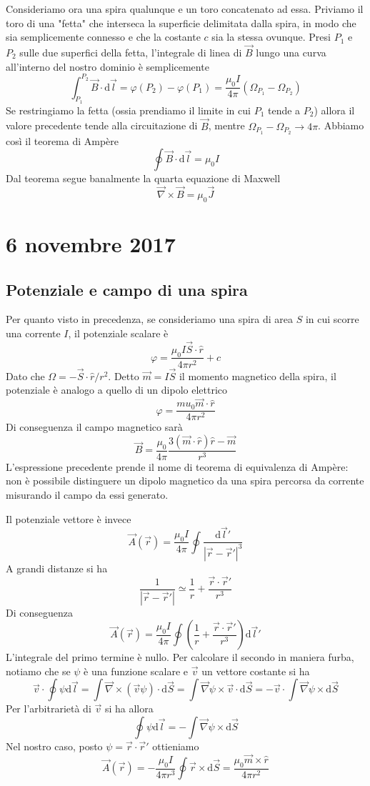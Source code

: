\documentclass[a4paper,11pt]{book}
\let\oldnabla\nabla
\renewcommand{\nabla}{\vec{\oldnabla}}
\newcommand{\dif}{\mathrm{d}}
\theoremstyle{definition}
\theoremstyle{theorem}
\begin{document}
Consideriamo ora una spira qualunque e un toro concatenato ad essa. Priviamo il toro di una "fetta" che interseca la superficie delimitata dalla spira, in modo che sia semplicemente connesso e che la costante $c$ sia la stessa ovunque. Presi $P_1$ e $P_2$ sulle due superfici della fetta, l'integrale di linea di $\vec{B}$ lungo una curva all'interno del nostro dominio è semplicemente
\[\int_{P_1}^{P_2}\vec{B}\cdot\dif\vec{l}=\varphi(P_2)-\varphi(P_1)=\frac{\mu_0I}{4\pi}(\Omega_{P_1}-\Omega_{P_2})\]
Se restringiamo la fetta (ossia prendiamo il limite in cui $P_1$ tende a $P_2$) allora il valore precedente tende alla circuitazione di $\vec{B}$, mentre $\Omega_{P_1}-\Omega_{P_2}\to4\pi$. Abbiamo così il teorema di Ampère
\[\oint\vec{B}\cdot\dif\vec{l}=\mu_0I\]
Dal teorema segue banalmente la quarta equazione di Maxwell
\[\nabla\times\vec{B}=\mu_0\vec{J}\]
\section{6 novembre 2017}
\subsection{Potenziale e campo di una spira}
Per quanto visto in precedenza, se consideriamo una spira di area $S$ in cui scorre una corrente $I$, il potenziale scalare è
\[\varphi=\frac{\mu_0I\vec{S}\cdot\hat{r}}{4\pi r^2}+c\]
Dato che $\Omega=-\vec{S}\cdot\hat{r}/r^2$. Detto $\vec{m}=I\vec{S}$ il momento magnetico della spira, il potenziale è analogo a quello di un dipolo elettrico
\[\varphi=\frac{mu_0\vec{m}\cdot\hat{r}}{4\pi r^2}\]
Di conseguenza il campo magnetico sarà
\[\vec{B}=\frac{\mu_0}{4\pi}\frac{3(\vec{m}\cdot\hat{r})\hat{r}-\vec{m}}{r^3}\]
L'espressione precedente prende il nome di teorema di equivalenza di Ampère: non è possibile distinguere un dipolo magnetico da una spira percorsa da corrente misurando il campo da essi generato.

Il potenziale vettore è invece
\[\vec{A}(\vec{r})=\frac{\mu_0I}{4\pi}\oint\frac{\dif\vec{l}'}{|\vec{r}-\vec{r}'|^3}\]
A grandi distanze si ha
\[\frac{1}{|\vec{r}-\vec{r}'|}\simeq\frac{1}{r}+\frac{\vec{r}\cdot\vec{r}'}{r^3}\]
Di conseguenza
\[\vec{A}(\vec{r})=\frac{\mu_0I}{4\pi}\oint\left(\frac{1}{r}+\frac{\vec{r}\cdot\vec{r}'}{r^3}\right)\dif\vec{l}'\]
L'integrale del primo termine è nullo. Per calcolare il secondo in maniera furba, notiamo che se $\psi$ è una funzione scalare e $\vec{v}$ un vettore costante si ha
\[\vec{v}\cdot\oint\psi\dif\vec{l}=\int\nabla\times(\vec{v}\psi)\cdot\dif\vec{S}=\int\nabla\psi\times\vec{v}\cdot\dif\vec{S}=-\vec{v}\cdot\int\nabla\psi\times\dif\vec{S}\]
Per l'arbitrarietà di $\vec{v}$ si ha allora
\[\oint\psi\dif\vec{l}=-\int\nabla\psi\times\dif\vec{S}\]
Nel nostro caso, posto $\psi=\vec{r}\cdot\vec{r}'$ ottieniamo
\[\vec{A}(\vec{r})=-\frac{\mu_0I}{4\pi r^3}\oint\vec{r}\times\dif\vec{S}=\frac{\mu_0\vec{m}\times\hat{r}}{4\pi r^2}\]
\end{document}
